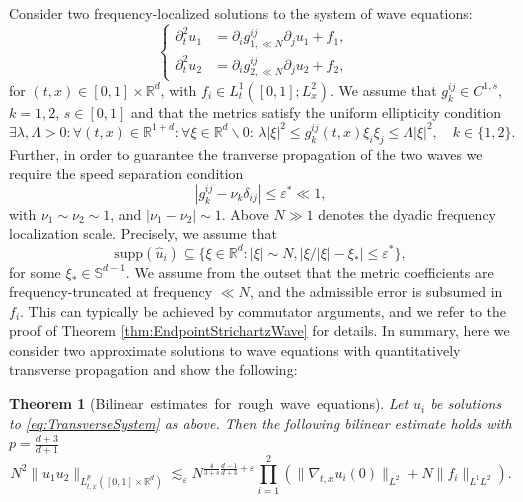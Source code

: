 \documentclass{amsart}
\newtheorem{theorem}{Theorem}[section]
\theoremstyle{definition}
\newcommand{\R}{\mathbb{R}}
\begin{document}
Consider two frequency-localized solutions to the system of wave equations:
\begin{equation}
\label{eq:TransverseSystem}
\left\{ \begin{array}{cl}
\partial_t^2 u_{1} &= \partial_i g^{ij}_{1, \ll N} \partial_j u_{1} + f_1, \\
\partial_t^2 u_{2} &= \partial_i g^{ij}_{2, \ll N} \partial_j u_{2} + f_2, \quad 
\end{array} \right.
\end{equation}
for $(t,x) \in [0,1] \times \R^d$,
with $f_i \in L_t^1([0,1];L_x^2)$. We assume that $g^{ij}_k \in C^{1,s}$, $k=1,2$, $s \in [0,1]$ and that the metrics satisfy the uniform ellipticity condition
\begin{equation}
\label{eq:UniformEllipticity}
\exists \lambda, \Lambda > 0: \forall (t,x) \in \R^{1+d}: \forall \xi \in \R^d \backslash 0: \, \lambda |\xi|^2 \leq g_k^{ij}(t,x) \xi_i \xi_j \leq \Lambda |\xi|^2, \quad k \in \{1,2\}.
\end{equation}
Further, in order to guarantee the tranverse propagation of the two waves we require the speed separation condition
\begin{equation*}
| g^{ij}_k - \nu_k \delta_{ij}| \leq \varepsilon^* \ll 1,
\end{equation*}
with $\nu_1 \sim \nu_2 \sim 1$, and $|\nu_1 - \nu_2| \sim 1$.  Above $N \gg 1$ denotes the dyadic frequency localization scale. Precisely, we assume that
\begin{equation}
\label{eq:FrequencyDirection}
\text{supp}(\hat{u}_i) \subseteq \{ \xi \in \R^d : |\xi| \sim N, \big| \xi / |\xi| - \xi_{*} \big| \leq \varepsilon^* \},
\end{equation}
for some $\xi_{*} \in \mathbb{S}^{d-1}$.
We assume from the outset that the metric coefficients are frequency-truncated at frequency $\ll N$, and the admissible error is subsumed in $f_i$. This can typically be achieved by commutator arguments, and we refer to the proof of Theorem \ref{thm:EndpointStrichartzWave} for details.
In summary, here we consider two approximate solutions to wave equations with quantitatively transverse propagation and show the following:

\begin{theorem}[Bilinear~estimates~for~rough~wave~equations]
\label{thm:RoughWaveEquationsIntro}
Let $u_i$ be solutions to \eqref{eq:TransverseSystem} as above. Then the following bilinear estimate holds with $p = \frac{d+3}{d+1}$
\begin{equation*}
N^2 \| u_{1} u_{2} \|_{L^p_{t,x}([0,1] \times \R^d)} \lesssim_\varepsilon N^{\frac{4}{3+s} \frac{d-1}{d+3} + \varepsilon} \prod_{i=1}^2 ( \| \nabla_{t,x} u_{i}(0) \|_{L^2} + N \| f_i \|_{L^1 L^2}).
\end{equation*}
\end{theorem}
\end{document}

